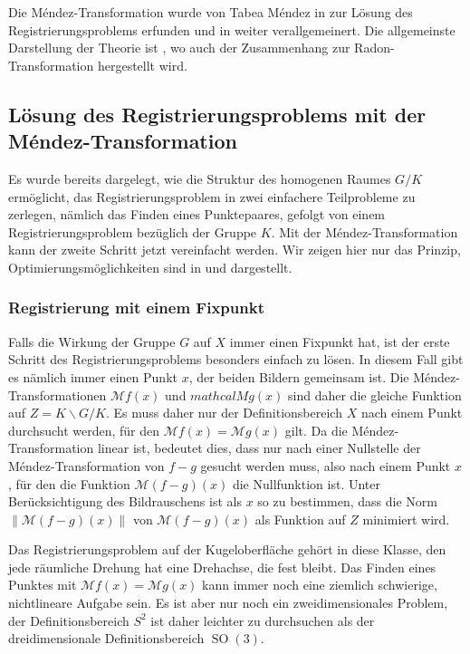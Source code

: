 Die Méndez-Transformation wurde von Tabea Méndez in 
\cite{buch:mendez} zur Lösung des Registrierungsproblems erfunden
und in \cite{buch:mendez-mueller} weiter verallgemeinert.
Die allgemeinste Darstellung der Theorie ist \cite[chapter 3]{buch:reg},
wo auch der Zusammenhang zur Radon-Transformation hergestellt wird.

%
%
\subsection{Lösung des Registrierungsproblems mit der Méndez-Transformation}
Es wurde bereits dargelegt, wie die Struktur des homogenen Raumes $G/K$
ermöglicht, das Registrierungsproblem in zwei einfachere Teilprobleme
zu zerlegen, nämlich das Finden eines Punktepaares, gefolgt von einem
Registrierungsproblem bezüglich der Gruppe $K$.
Mit der Méndez-Transformation kann der zweite Schritt jetzt vereinfacht
werden.
Wir zeigen hier nur das Prinzip, Optimierungsmöglichkeiten sind in
\cite{buch:mendez-mueller} und \cite{buch:reg} dargestellt.

%
%
\subsubsection{Registrierung mit einem Fixpunkt}
Falls die Wirkung der Gruppe $G$ auf $X$ immer einen Fixpunkt hat,
ist der erste Schritt des Registrierungsproblems besonders einfach
zu lösen.
In diesem Fall gibt es nämlich immer einen Punkt $x$, der beiden
Bildern gemeinsam ist.
Die Méndez-Transformationen $\mathcal{M}f(x)$ und $mathcal{M}g(x)$
sind daher die gleiche Funktion auf $Z=K\backslash G/K$.
Es muss daher nur der Definitionsbereich $X$ nach einem Punkt
durchsucht werden, für den $\mathcal{M}f(x) = \mathcal{M}g(x)$
gilt.
Da die Méndez-Transformation linear ist, bedeutet dies, dass nur
nach einer Nullstelle der Méndez-Transformation von $f-g$ gesucht
werden muss, also nach einem Punkt $x$, für den die Funktion
\(
\mathcal{M}(f-g)(x)
\)
die Nullfunktion ist.
Unter Berücksichtigung des Bildrauschens ist als $x$ so zu bestimmen,
dass die Norm $\| \mathcal{M}(f-g)(x) \|$ von $\mathcal{M}(f-g)(x)$
als Funktion auf $Z$ minimiert wird.

Das Registrierungsproblem auf der Kugeloberfläche gehört in diese
Klasse, den jede räumliche Drehung hat eine Drehachse, die fest
bleibt.
Das Finden eines Punktes mit $\mathcal{M}f(x)=\mathcal{M}g(x)$ 
kann immer noch eine ziemlich schwierige, nichtlineare Aufgabe sein.
Es ist aber nur noch ein zweidimensionales Problem, der Definitionsbereich
$S^2$ ist daher leichter zu durchsuchen als der dreidimensionale
Definitionsbereich $\operatorname{SO}(3)$.

